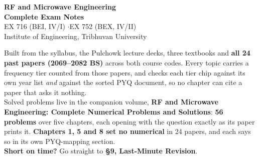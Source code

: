 \documentclass[10pt]{article}
\begin{document}
\thispagestyle{empty}
\vspace*{2.0cm}
\begin{center}
  {\Huge\bfseries\color{acc} RF and Microwave Engineering}\\[6pt]
  {\LARGE\bfseries Complete Exam Notes}\\[14pt]
  {\large\color{sub} EX 716 (BEI, IV/I) \quad$\cdot$\quad EX 752 (BEX, IV/II)}\\[3pt]
  {\color{sub} Institute of Engineering, Tribhuvan University}\\[20pt]
  \begin{minipage}{0.78\textwidth}
    \color{sub}\small
    Built from the syllabus, the Pulchowk lecture decks, three textbooks and \textbf{all 24
    past papers (2069--2082 BS)} across both course codes. Every topic carries a frequency
    tier counted from those papers, and  checks each tier chip against
    its own year list \emph{and} against the sorted PYQ document, so no chapter can cite a
    paper that asks it nothing.\\[8pt]
    Solved problems live in the companion volume, \textbf{RF and Microwave Engineering:
    Complete Numerical Problems and Solutions}: \textbf{56 problems} over five chapters,
    each opening with the question exactly as its paper prints it. \textbf{Chapters 1, 5 and
    8 set no numerical} in 24 papers, and each says so in its own PYQ-mapping section.\\[8pt]
    \textbf{Short on time?} Go straight to \textbf{\S9, Last-Minute Revision}.
  \end{minipage}
\end{center}

\vfill

\end{document}
